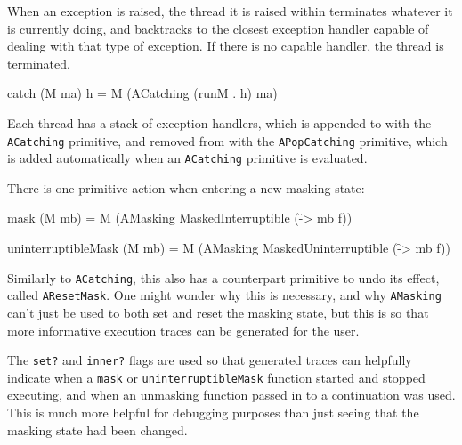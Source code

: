 When an exception is raised, the thread it is raised within terminates
whatever it is currently doing, and backtracks to the closest
exception handler capable of dealing with that type of exception. If
there is no capable handler, the thread is terminated.

\begin{haskellcode}
catch (M ma) h = M (ACatching (runM . h) ma)
\end{haskellcode}


Each thread has a stack of exception handlers, which is appended to
with the \verb|ACatching| primitive, and removed from with the
\verb|APopCatching| primitive, which is added automatically when an
\verb|ACatching| primitive is evaluated.


There is one primitive action when entering a new masking state:

\begin{haskellcode}
mask (M mb) = M (AMasking MaskedInterruptible (\f -> mb f))

uninterruptibleMask (M mb) = M (AMasking MaskedUninterruptible (\f -> mb f))
\end{haskellcode}


Similarly to \verb|ACatching|, this also has a counterpart primitive
to undo its effect, called \verb|AResetMask|. One might wonder why
this is necessary, and why \verb|AMasking| can't just be used to both
set and reset the masking state, but this is so that more informative
execution traces can be generated for the user.


The \verb|set?| and \verb|inner?| flags are used so that generated
traces can helpfully indicate when a \verb|mask| or
\verb|uninterruptibleMask| function started and stopped executing, and
when an unmasking function passed in to a continuation was used. This
is much more helpful for debugging purposes than just seeing that the
masking state had been changed.

